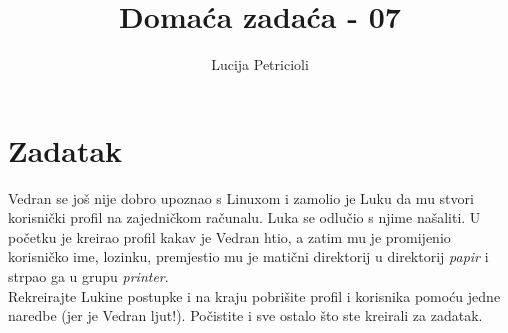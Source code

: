 \documentclass[12pt,a4paper]{article}
\begin{document}
	\title{Domaća zadaća - 07}
	\author{Lucija Petricioli}
	\maketitle
	\section{Zadatak}
	Vedran se još nije dobro upoznao s Linuxom i zamolio je Luku da mu stvori korisnički profil na zajedničkom računalu. Luka se odlučio s njime našaliti. U početku je kreirao profil kakav je Vedran htio, a zatim mu je promijenio korisničko ime, lozinku, premjestio mu je matični direktorij u direktorij \textit{papir} i strpao ga u grupu \textit{printer}. \\
	Rekreirajte Lukine postupke i na kraju pobrišite profil i korisnika pomoću jedne naredbe (jer je Vedran ljut!). Počistite i sve ostalo što ste kreirali za zadatak.
	
\end{document}
